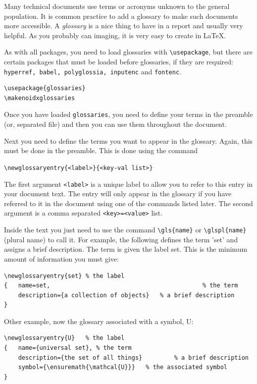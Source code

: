 Many technical documents use terms or acronyms unknown to the general population. It is common practice to add a glossary to make such documents more accessible. A \textit{glossary} is a nice thing to have in a report and usually very helpful. As you probably can imaging, it is very easy to create in \LaTeX. 

As with all packages, you need to load glossaries with \verb|\usepackage|, but there are certain packages that must be loaded before glossaries, if they are required: \texttt{hyperref, babel, polyglossia, inputenc} and \texttt{fontenc}.

\begin{verbatim}
\usepackage{glossaries} 
\makenoidxglossaries
\end{verbatim}

Once you have loaded \texttt{glossaries}, you need to define your terms in the preamble (or, separated file) and then you can use them throughout the document. 

Next you need to define the terms you want to appear in the glossary. Again, this must be done in the preamble. This is done using the command

\verb|\newglossaryentry{<label>}{<key-val list>}|

The first argument \verb|<label>| is a unique label to allow you to refer to this entry in your document text. The entry will only appear in the glossary if you have referred to it in the document using one of the commands listed later. The second argument is a comma separated \verb|<key>=<value>| list.

Inside the text you just need to use the command \verb|\gls{name}| or \verb|\glspl{name}| (plural name) to call it. For example, the following defines the term 'set' and assigns a brief description. The term is given the label set. This is the minimum amount of information you must give:

\begin{verbatim}
\newglossaryentry{set} % the label
{	name=set,            								% the term
 	description={a collection of objects} 	% a brief description
}
 \end{verbatim}

Other example, now the glossary associated with a symbol, \gls{U}:

\begin{verbatim}
\newglossaryentry{U}   % the label
{	name={universal set}, % the term
 	description={the set of all things} 		% a brief description
 	symbol={\ensuremath{\mathcal{U}}}  	% the associated symbol 
}
 \end{verbatim}
 
